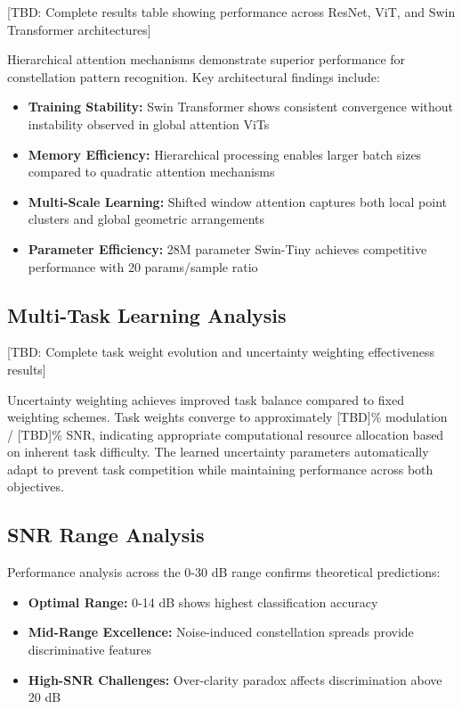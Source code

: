 \documentclass{ELSP}
\begin{document}
{{[TBD: Complete results table showing performance across ResNet, ViT, and Swin Transformer architectures]

Hierarchical attention mechanisms demonstrate superior performance for constellation pattern recognition. Key architectural findings include:

\begin{itemize}
    \item \textbf{Training Stability:} Swin Transformer shows consistent convergence without instability observed in global attention ViTs
    \item \textbf{Memory Efficiency:} Hierarchical processing enables larger batch sizes compared to quadratic attention mechanisms  
    \item \textbf{Multi-Scale Learning:} Shifted window attention captures both local point clusters and global geometric arrangements
    \item \textbf{Parameter Efficiency:} 28M parameter Swin-Tiny achieves competitive performance with 20 params/sample ratio
\end{itemize}

\subsection{Multi-Task Learning Analysis}

[TBD: Complete task weight evolution and uncertainty weighting effectiveness results]

Uncertainty weighting achieves improved task balance compared to fixed weighting schemes. Task weights converge to approximately [TBD]\% modulation / [TBD]\% SNR, indicating appropriate computational resource allocation based on inherent task difficulty. The learned uncertainty parameters automatically adapt to prevent task competition while maintaining performance across both objectives.

\subsection{SNR Range Analysis}

Performance analysis across the 0-30 dB range confirms theoretical predictions:
\begin{itemize}
    \item \textbf{Optimal Range:} 0-14 dB shows highest classification accuracy
    \item \textbf{Mid-Range Excellence:} Noise-induced constellation spreads provide discriminative features
    \item \textbf{High-SNR Challenges:} Over-clarity paradox affects discrimination above 20 dB
\end{itemize}

}}
\end{document}
